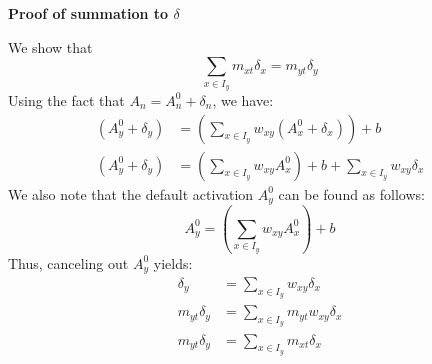 \documentclass{article}
\begin{document}
{\bf Proof of summation to $\delta$}

We show that
\begin{equation}
\sum_{x \in I_y} m_{xt} \delta_x = m_{yt} \delta_y
\end{equation}
Using the fact that $A_n = A_n^0 + \delta_n$, we have:
\begin{equation}
\begin{aligned}
(A_y^0 + \delta_y) &= \left(\sum_{x \in I_y} w_{xy} (A_x^0 + \delta_x) \right) + b \\
(A_y^0 + \delta_y) &= \left(\sum_{x \in I_y} w_{xy} A_x^0 \right) + b + \sum_{x \in I_y} w_{xy} \delta_x
\end{aligned}
\end{equation} 
We also note that the default activation $A_y^0$ can be found as follows:
\begin{equation}
A_y^0 = \left(\sum_{x \in I_y} w_{xy} A_x^0 \right) + b
\end{equation}
Thus, canceling out $A_y^0$ yields:
\begin{equation}
\begin{aligned}
\delta_y &= \sum_{x \in I_y} w_{xy} \delta_x\\
m_{yt} \delta_y &= \sum_{x \in I_y} m_{yt} w_{xy} \delta_x\\
m_{yt} \delta_y &= \sum_{x \in I_y} m_{xt} \delta_x 
\end{aligned}
\end{equation} 
\end{document}
